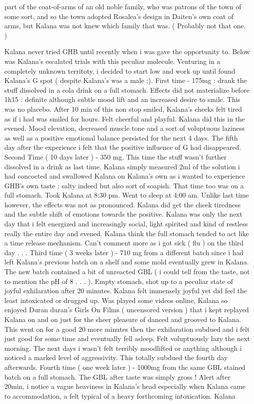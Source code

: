 \documentclass[12pt]{book}
\begin{document}
part of the coat-of-arms of an old noble family, who was patrons of the town of some sort, and so the town adopted Rosalea's design in Daiten's own coat of arms, but Kalana was not knew which family that was. ( Probably not that one. )



Kalana never tried GHB until recently when i was gave the opportunity to. Below was Kalana's escalated trials with this peculiar molecule. Venturing in a completely unknown territoty, i decided to start low and work up until found Kalana's G spot ( despite Kalana's was a male ;). First time - 175mg : drank the stuff dissolved in a cola drink on a full stomach. Effects did not materialize before 1h15 : definite although subtle mood lift and an increased desire to smile. This was no placebo. After 10 min of this non stop smiled, Kalana's cheeks felt tired as if i had was smiled for hours. Felt cheerful and playful. Kalana did this in the evened. Mood elevation, decreased muscle tone and a sort of voluptuous laziness as well as a positive emotional balance persisted for the next 4 days. The fifth day after the experience i felt that the positive influence of G had disappeared. Second Time ( 10 days later ) - 350 mg. This time the stuff wasn't further dissolved in a drink as last time. Kalana simply measured 2ml of the solution i had concocted and swallowed Kalana on Kalana's own as i wanted to experience GHB's own taste : salty indeed but also sort of soapish. That time too was on a full stomach. Took Kalana at 8:30 pm. Went to sleep at 4:00 am. Unlike last time however, the effects was not as pronounced. Kalana did get the cheek tiredness and the subtle shift of emotions towards the positive. Kalana was only the next day that i felt energized and increasingly social, light spirited and kind of restless really the entire day and evened. Kalana think the full stomach tended to act like a time release mechanism. Can't comment more as i got sick ( flu ) on the third day . . .  Third time ( 3 weeks later ) - 710 mg from a different batch since i had left Kalana's previous batch on a shelf and some mold eventually grew in Kalana. The new batch contained a bit of unreacted GBL ( i could tell from the taste, not to mention the pH of 8 . . .  ). Empty stomach, shot up to a peculiar state of joyful exhilaration after 20 minutes. Kalana felt immensely joyful yet did feel the least intoxicated or drugged up. Was played some videos online, Kalana so enjoyed Duran duran's Girls On Films ( uncensored version ) that i kept replayed Kalana on and on just for the sheer pleasure of danced and grooved to Kalana. This went on for a good 20 more minutes then the exhilaration subdued and i felt just good for some time and eventually fell asleep. Felt voluptuously lazy the next morning. The next days i wasn't felt terribly moodlifted or anything although i noticed a marked level of aggressivity. This totally subdued the fourth day afterwards. Fourth time ( one week later ) - 1000mg from the same GBL stained batch on a full stomach. The GBL after taste was simply gross ! Alert after 20min, i notice a vague heaviness in Kalana's head especially when Kalana came to accommodation, a felt typical of a heavy forthcoming intoxication. Kalana 
\end{document}
